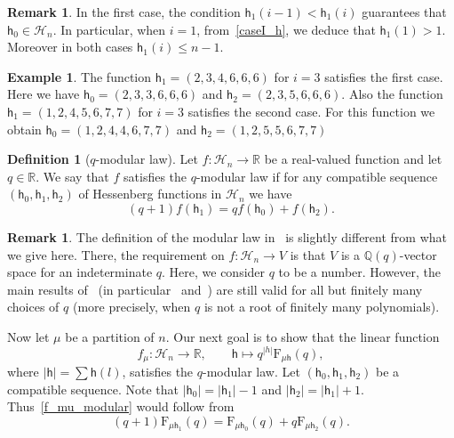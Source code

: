 \documentclass[12pt,a4paper,reqno]{amsart}
\theoremstyle{plain}
\theoremstyle{definition}
\newtheorem{definition}[theorem]{Definition}
\newtheorem{remark}[theorem]{Remark}
\newtheorem{example}[theorem]{Example}
\newcommand{\RR}{{\mathbb{R}}}
\newcommand{\1}{\mathds{1}}
\newcommand{\F}{\mathrm{F}}
\newcommand{\hes}{\mathsf{h}}
\begin{document}
\begin{remark}
In the first case, the condition $\hes_1(i-1) < \hes_1(i)$ guarantees that $\hes_0 \in \mathcal{H}_n$. In particular, when $i=1$, from~\cref{caseI_h}, we deduce that $\hes_1(1) > 1$. Moreover in both cases $\hes_1(i)\leq n-1$.
\end{remark}
\begin{example} The function $\hes_1=(2,3,4,6,6,6)$ for $i=3$ satisfies the first case. Here we have $\hes_0=(2,3,3,6,6,6)$ and $\hes_2=(2,3,5,6,6,6)$. Also the function $\hes_1=(1,2,4,5,6,7,7)$ for $i=3$ satisfies the second  case. For this function we obtain $\hes_0=(1,2,4,4,6,7,7)$ and $\hes_2=(1,2,5,5,6,7,7)$
\end{example}
\begin{definition}[$q$-modular law] Let $f:\mathcal{H}_n\to \RR$ be a real-valued function  and let $q\in\RR$. We say that $f$ satisfies the $q$-modular law if for any compatible sequence $(\hes_0,\hes_1,\hes_2)$ of Hessenberg functions in $\mathcal{H}_n$ we have 
\begin{equation}\label{q-modular}
    (q+1)f(\hes_1)=qf(\hes_0)+f(\hes_2).
\end{equation}    
\end{definition}
\begin{remark} The definition of the modular law in~\cite{Abreu-Nigro} is slightly different from what we give here. There, the requirement on  $f: \mathcal{H}_n \to V$ is  that $V$ is a $\mathbb{Q}(q)$-vector space for an indeterminate $q$. Here,  we consider $q$ to be a number.
However, the main results of~\cite{Abreu-Nigro} (in particular~\cite[Theorem 1.2]{Abreu-Nigro} and~\cite[Algorithm 2.8]{Abreu-Nigro}) are still valid for all but finitely many choices of $q$ (more precisely, when $q$ is not a root of finitely many polynomials).
\end{remark}
Now let $\mu$ be a partition of $n$. Our next goal is to show that the linear function  
\begin{equation}\label{f_mu_modular}
    f_\mu: \mathcal{H}_n\to \RR,\qquad \hes\mapsto q^{|h|}\F_{\mu\hes}(q),
\end{equation}
where $|\hes|=\sum \hes(l)$, 
satisfies the $q$-modular law. Let $(\hes_0,\hes_1,\hes_2)$ be a compatible sequence. Note that $|\hes_0|=|\hes_1|-1$ and $|\hes_2|=|\hes_1|+1$. Thus~\cref{f_mu_modular} would follow from 
\begin{equation}\label{F_mu_modular}
    (q+1)\F_{\mu\hes_1}(q)=\F_{\mu\hes_0}(q)+q\F_{\mu\hes_2}(q).
\end{equation}
\end{document}
